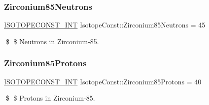 \subsubsection{\texorpdfstring{Zirconium85\+Neutrons}{Zirconium85Neutrons}}
{\footnotesize\ttfamily \mbox{\hyperlink{group___isotope_const-_macros_ga5f18360b3e99483a35c32d789e62621c}{I\+S\+O\+T\+O\+P\+E\+C\+O\+N\+S\+T\+\_\+\+I\+NT}} Isotope\+Const\+::\+Zirconium85\+Neutrons = 45}

\$ \$ Neutrons in Zirconium-\/85. \mbox{\label{group___isotope_const-_zirconium-_zr85_gacde07b7224cf4e323eb0b66bfc127328}} 
\subsubsection{\texorpdfstring{Zirconium85\+Protons}{Zirconium85Protons}}
{\footnotesize\ttfamily \mbox{\hyperlink{group___isotope_const-_macros_ga5f18360b3e99483a35c32d789e62621c}{I\+S\+O\+T\+O\+P\+E\+C\+O\+N\+S\+T\+\_\+\+I\+NT}} Isotope\+Const\+::\+Zirconium85\+Protons = 40}

\$ \$ Protons in Zirconium-\/85. 